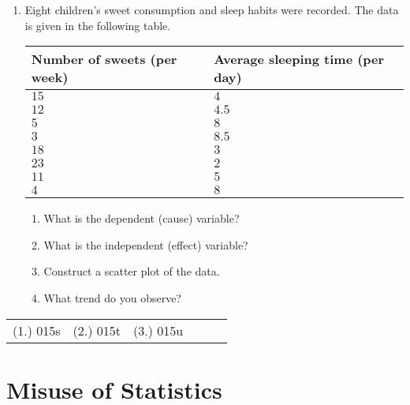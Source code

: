 {\begin{enumerate}
	\begin{enumerate}
	\item Construct a scatter plot and explain how you chose the dependent (cause) and independent (effect) variables.
	\item What pattern or trend do you observe?
	\end{enumerate}
\item Eight children's sweet consumption and sleep habits were recorded. The data is given in the following table.

\begin{center}
\begin{tabular}{|l|l|}
\hline
Number of sweets (per week) & Average sleeping time (per day) \\ 
\hline
$15$ & $4   $\\
$12$ & $4.5 $\\
$5 $ & $8   $\\
$3 $ & $8.5$ \\
$18$ & $3 $  \\
$23$ & $2$   \\
$11$ & $5$   \\
$4$  & $8$   \\
\hline
\end{tabular}
\end{center}

	\begin{enumerate}
	\item What is the dependent (cause) variable? 
	\item What is the independent (effect) variable?
	\item Construct a scatter plot of the data.
	\item What trend do you observe?
	\end{enumerate}
\end{enumerate}


\par \practiceinfo
\par \begin{tabular}[h]{cccccc}
(1.)	015s	&
(2.)	015t	&
(3.)	015u	&
\end{tabular}}

\section{Misuse of Statistics}

